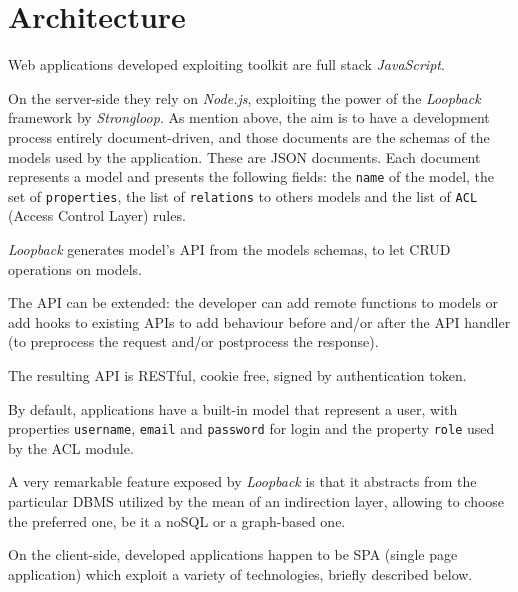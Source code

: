 \section{Architecture}\label{sec:architecture}

Web applications developed exploiting  toolkit are full stack {\em JavaScript}. 

On the server-side they rely on {\em Node.js}, exploiting the power of the {\em Loopback} framework by {\em Strongloop}. As mention above, the aim is to have a development process entirely document-driven, and those documents are the schemas of the models used by the application. These are JSON documents. Each document represents a model and presents the following fields: the \texttt{name} of the model, the set of \texttt{properties}, the list of \texttt{relations} to others models and the list of \texttt{ACL} (Access Control Layer) rules. 

{\em Loopback} generates model’s API from the models schemas, to let CRUD operations on models.

The API can be extended: the developer can add remote functions to models or add hooks to existing APIs to add behaviour before and/or after the API handler (to preprocess the request and/or postprocess the response). 


The resulting API is RESTful, cookie free, signed by authentication token.

By default, applications have a built-in model that represent a user, with
properties \texttt{username}, \texttt{email} and \texttt{password} for login
and the property \texttt{role} used by the ACL module.

A very remarkable feature exposed by {\em Loopback} is that it abstracts from the particular DBMS utilized by the mean of an indirection layer, allowing to choose the preferred one, be it a noSQL or a graph-based one.


On the client-side, developed applications happen to be SPA (single page
application) which exploit a variety of technologies, briefly described below.

